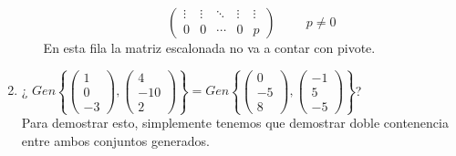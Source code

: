 \documentclass{article}
\begin{document}
\begin{enumerate}
\begin{enumerate}[label=\listAlph]
                \[
                    \left(
                    \begin{array}{cccc|c}
                        \vdots & \vdots & \ddots & \vdots & \vdots \\
                        0 & 0 & \cdots & 0 & p
                    \end{array}
                    \right)
                    \hspace{1cm}
                    p \neq 0
                \]
                En esta fila la matriz escalonada no va a contar con pivote.
        \end{enumerate}
    \item ¿%
        \(
            Gen
            \left\{
                \begin{pmatrix}
                    1 \\ 0 \\ -3
                \end{pmatrix},
                \begin{pmatrix}
                    4 \\ -10 \\ 2
                \end{pmatrix}
            \right\}
            =
            Gen
            \left\{
                \begin{pmatrix}
                    0 \\ -5 \\ 8
                \end{pmatrix},
                \begin{pmatrix}
                    -1 \\ 5 \\ -5
                \end{pmatrix}
            \right\}
        \)? \\
        Para demostrar esto, simplemente tenemos que demostrar doble contenencia entre ambos conjuntos generados.

\end{enumerate}
\end{document}
